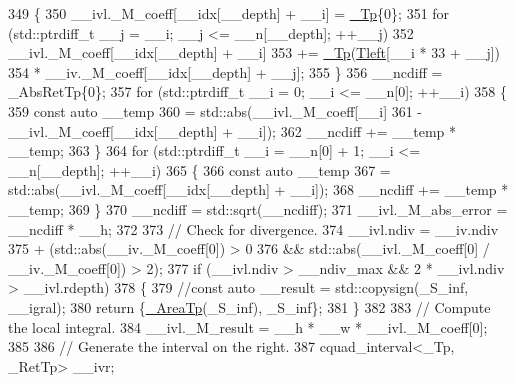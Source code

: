 \begin{DoxyCode}
349                 \{
350                   \_\_ivl.\_M\_coeff[\_\_idx[\_\_depth] + \_\_i] = \hyperlink{namespace____gnu__cxx_a3b19a9c800ca194374ef9172290f7d79}{\_Tp}\{0\};
351                   \textcolor{keywordflow}{for} (std::ptrdiff\_t \_\_j = \_\_i; \_\_j <= \_\_n[\_\_depth]; ++\_\_j)
352                     \_\_ivl.\_M\_coeff[\_\_idx[\_\_depth] + \_\_i]
353                         += \hyperlink{namespace____gnu__cxx_a3b19a9c800ca194374ef9172290f7d79}{\_Tp}(\hyperlink{namespace____gnu__cxx_a7e499d0005aca8d0d6dd4eb30c0bc008}{Tleft}[\_\_i * 33 + \_\_j])
354                            * \_\_iv.\_M\_coeff[\_\_idx[\_\_depth] + \_\_j];
355                 \}
356               \_\_ncdiff = \_AbsRetTp\{0\};
357               \textcolor{keywordflow}{for} (std::ptrdiff\_t \_\_i = 0; \_\_i <= \_\_n[0]; ++\_\_i)
358                 \{
359                   \textcolor{keyword}{const} \textcolor{keyword}{auto} \_\_temp
360                     = std::abs(\_\_ivl.\_M\_coeff[\_\_i]
361                              - \_\_ivl.\_M\_coeff[\_\_idx[\_\_depth] + \_\_i]);
362                   \_\_ncdiff += \_\_temp * \_\_temp;
363                 \}
364               \textcolor{keywordflow}{for} (std::ptrdiff\_t \_\_i = \_\_n[0] + 1; \_\_i <= \_\_n[\_\_depth]; ++\_\_i)
365                 \{
366                   \textcolor{keyword}{const} \textcolor{keyword}{auto} \_\_temp
367                     = std::abs(\_\_ivl.\_M\_coeff[\_\_idx[\_\_depth] + \_\_i]);
368                   \_\_ncdiff += \_\_temp * \_\_temp;
369                 \}
370               \_\_ncdiff = std::sqrt(\_\_ncdiff);
371               \_\_ivl.\_M\_abs\_error = \_\_ncdiff * \_\_h;
372 
373               \textcolor{comment}{// Check for divergence.}
374               \_\_ivl.ndiv = \_\_iv.ndiv
375                          + (std::abs(\_\_iv.\_M\_coeff[0]) > 0
376                          && std::abs(\_\_ivl.\_M\_coeff[0] / \_\_iv.\_M\_coeff[0]) > 2);
377               \textcolor{keywordflow}{if} (\_\_ivl.ndiv > \_\_ndiv\_max && 2 * \_\_ivl.ndiv > \_\_ivl.rdepth)
378                 \{
379                   \textcolor{comment}{//const auto \_\_result = std::copysign(\_S\_inf, \_\_igral);}
380                   \textcolor{keywordflow}{return} \{\hyperlink{namespace____gnu__cxx_ae97a51b75e19c30f48d27fac4664de6e}{\_AreaTp}(\_S\_inf), \_S\_inf\};
381                 \}
382 
383               \textcolor{comment}{// Compute the local integral.}
384               \_\_ivl.\_M\_result = \_\_h * \_\_w * \_\_ivl.\_M\_coeff[0];
385 
386               \textcolor{comment}{// Generate the interval on the right.}
387               cquad\_interval<\_Tp, \_RetTp> \_\_ivr;

\end{DoxyCode}
